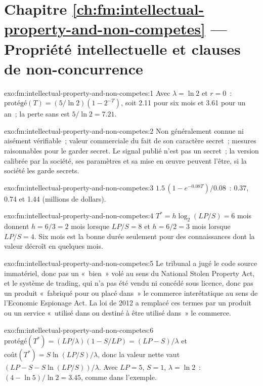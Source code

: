 \section*{Chapitre \ref{ch:fm:intellectual-property-and-non-competes} --- Propriété intellectuelle et clauses de non-concurrence}

\begin{solution}{exo:fm:intellectual-property-and-non-competes:1}
Avec $\lambda=\ln2$ et $r=0$~: $\text{protégé}(T)=(5/\ln2)(1-2^{-T})$, soit 2.11 pour six mois et 3.61 pour un an~; la perte sans  est
$5/\ln2=7.21$.
\end{solution}

\begin{solution}{exo:fm:intellectual-property-and-non-competes:2}
Non généralement connue ni aisément vérifiable~; valeur commerciale du fait de son caractère secret~; mesures raisonnables pour le garder secret. Le signal publié n'est pas un
secret~; la version calibrée par la société, ses paramètres et sa mise en œuvre peuvent l'être, si la société les garde secrets.
\end{solution}

\begin{solution}{exo:fm:intellectual-property-and-non-competes:3}
$1.5\,(1-e^{-0.08T})/0.08$~: 0.37, 0.74 et 1.44 (millions de dollars).
\end{solution}

\begin{solution}{exo:fm:intellectual-property-and-non-competes:4}
$T^*=h\log_2(LP/S)=6$ mois donnent $h=6/3=2$ mois lorsque $LP/S=8$ et $h=6/2=3$ mois lorsque $LP/S=4$. Six mois est la bonne durée seulement pour
des connaissances dont la valeur décroît en quelques mois.
\end{solution}

\begin{solution}{exo:fm:intellectual-property-and-non-competes:5}
Le tribunal a jugé le code source immatériel, donc pas un «~bien~» volé au sens du National Stolen Property Act, et le système de trading, qui n'a pas été
vendu ni concédé sous licence, donc pas un produit «~fabriqué pour ou placé dans~» le commerce interétatique au sens de l'Economic Espionage Act. La loi de 2012 a remplacé ces
termes par un produit ou un service «~utilisé dans ou destiné à être utilisé dans~» le commerce.
\end{solution}

\begin{solution}{exo:fm:intellectual-property-and-non-competes:6}
$\text{protégé}(T^*)=(LP/\lambda)(1-S/LP)=(LP-S)/\lambda$ et $\text{coût}(T^*)=S\ln(LP/S)/\lambda$, donc la valeur nette vaut $(LP-S-S\ln(LP/S))/\lambda$.
Avec $LP=5$, $S=1$, $\lambda=\ln2$~: $(4-\ln5)/\ln2=3.45$, comme dans l'exemple.
\end{solution}

